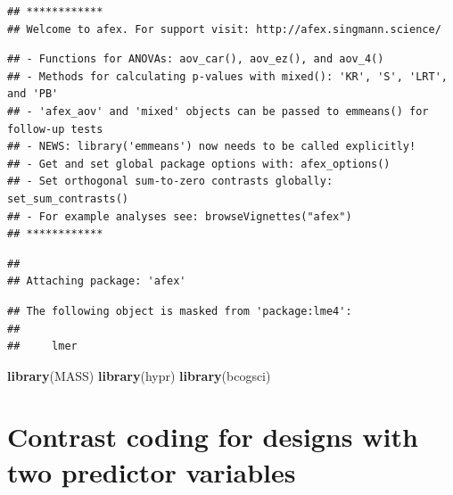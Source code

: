 \documentclass[12pt,]{krantz}
\newenvironment{Shaded}{\begin{snugshade}}{\end{snugshade}}
\newcommand{\KeywordTok}[1]{\textcolor[rgb]{0.13,0.29,0.53}{\textbf{#1}}}
\newcommand{\NormalTok}[1]{#1}
\begin{document}
\begin{verbatim}
## ************
## Welcome to afex. For support visit: http://afex.singmann.science/
\end{verbatim}

\begin{verbatim}
## - Functions for ANOVAs: aov_car(), aov_ez(), and aov_4()
## - Methods for calculating p-values with mixed(): 'KR', 'S', 'LRT', and 'PB'
## - 'afex_aov' and 'mixed' objects can be passed to emmeans() for follow-up tests
## - NEWS: library('emmeans') now needs to be called explicitly!
## - Get and set global package options with: afex_options()
## - Set orthogonal sum-to-zero contrasts globally: set_sum_contrasts()
## - For example analyses see: browseVignettes("afex")
## ************
\end{verbatim}

\begin{verbatim}
## 
## Attaching package: 'afex'
\end{verbatim}

\begin{verbatim}
## The following object is masked from 'package:lme4':
## 
##     lmer
\end{verbatim}

\begin{Shaded}
\begin{Highlighting}[]
\KeywordTok{library}\NormalTok{(MASS)}
\KeywordTok{library}\NormalTok{(hypr)}
\KeywordTok{library}\NormalTok{(bcogsci)}
\end{Highlighting}
\end{Shaded}

\hypertarget{ch:coding2x2}{%
\chapter{Contrast coding for designs with two predictor variables}\label{ch:coding2x2}}
\end{document}
